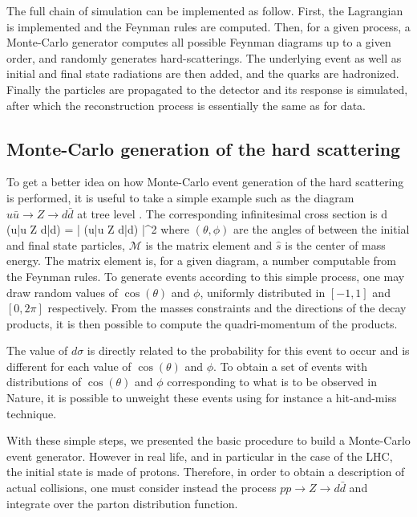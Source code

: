     The full chain of simulation can be implemented as follow. First, the
    Lagrangian is implemented and the Feynman rules are computed. Then, for a
    given process, a Monte-Carlo generator computes all possible Feynman
    diagrams up to a given order, and randomly generates hard-scatterings. The
    underlying event as well as initial and final state radiations are then
    added, and the quarks are hadronized. Finally the particles are propagated
    to the detector and its response is simulated, after which the
    reconstruction process is essentially the same as for data.

    \subsection{Monte-Carlo generation of the hard scattering}

    To get a better idea on how Monte-Carlo event generation of the hard
    scattering is performed, it is useful to take a simple example such as the
    diagram $u\bar{u} \rightarrow Z \rightarrow d\bar{d}$ at tree level
    \cite{MCGenLesHouches}. The corresponding infinitesimal cross section is
    {
        d \sigma(u\bar{u} \rightarrow Z \rightarrow d\bar{d})
        =
        \left|
            (u\bar{u} \rightarrow Z \rightarrow d\bar{d})
        \right|^2
    }
    where $(\theta,\phi)$ are the angles of between the initial and final state
    particles, $\mathcal{M}$ is the matrix element and $\hat{s}$ is the center
    of mass energy. The matrix element is, for a given diagram, a number
    computable from the Feynman rules.  To generate events according to this
    simple process, one may draw random values of $\cos(\theta)$ and $\phi$,
    uniformly distributed in $[-1, 1]$ and $[0,2\pi]$ respectively. From the
    masses constraints and the directions of the decay products, it is then
    possible to compute the quadri-momentum of the products.

    The value of $d\sigma$ is directly related to the probability for this event
    to occur and is different for each value of $\cos(\theta)$ and $\phi$. To
    obtain a set of events with distributions of $\cos(\theta)$ and $\phi$
    corresponding to what is to be observed in Nature, it is possible to
    unweight these events using for instance a hit-and-miss technique.

    With these simple steps, we presented the basic procedure to build a
    Monte-Carlo event generator. However in real life, and in particular in the
    case of the LHC, the initial state is made of protons. Therefore, in order
    to obtain a description of actual collisions, one must consider instead the
    process $pp \rightarrow Z \rightarrow d\bar{d}$ and integrate over the
    parton distribution function.

